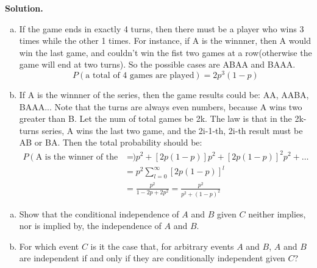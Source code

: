 \documentclass{article}
\begin{document}
{\bf Solution.}
\begin{enumerate}[(a)]
    \item If the game ends in exactly 4 turns, then there must be a player who wins 3 times while the other 1 times. For instance, if A is the winnner, then A would win the last game, and couldn't win the fist two games at a row(otherwise the game will end at two turns). So the possible cases are ABAA and BAAA.
    $$ P(\text{a total of 4 games are played})=2p^3(1-p) $$
    \item If A is the winnner of the series, then the game results could be: AA, AABA, BAAA... Note that the turns are always even numbers, because A wins two greater than B. Let the num of total games be 2k. The law is that in the 2k-turns series, A wins the last two game, and the 2i-1-th, 2i-th result must be AB or BA. 
    Then the total probability should be:
    $$ \begin{align}
    P(\text{A is the winner of the series}) &= p^2 + \left[2p(1-p)\right]p^2 + \left[2p(1-p)\right]^2p^2+\dots\\
    &= p^2\sum_{l=0}^{\infty}\left[2p(1-p)\right]^l\\
    & = \frac{p^2}{1-2p+2p^2} = \frac{p^2}{p^2+(1-p)^2}
    \end{align} $$
\end{enumerate}

\begin{question}
\begin{enumerate}[(a)]
    \item Show that the conditional independence of $A$ and $B$ given $C$ neither implies, nor is implied by, the independence of $A$ and $B$.
    \item For which event $C$ is it the case that, for arbitrary events $A$ and $B$, $A$ and $B$ are independent if and only if they are conditionally independent given $C$?
\end{enumerate}
\end{question}
\end{document}
